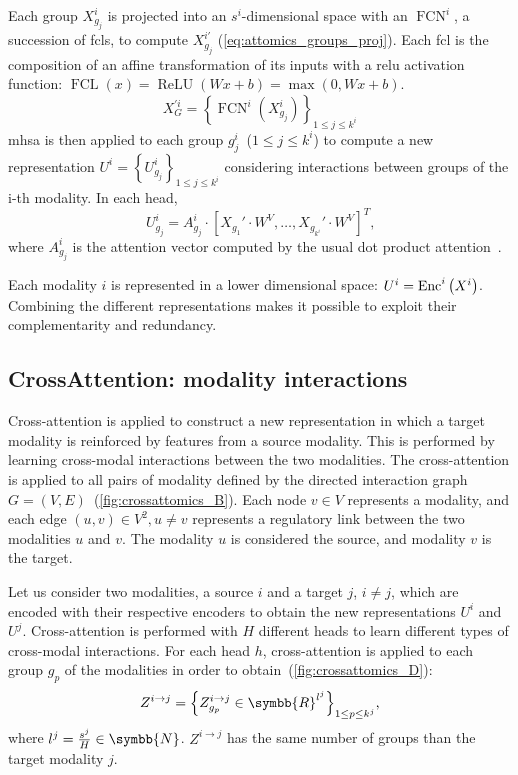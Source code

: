 \documentclass[../main.tex]{subfiles}
\begin{document}
		Each group  \(X^{i}_{g_j}\) is projected into an \(s^i\)-dimensional space with an \(\operatorname{FCN}^i\), a succession of \glspl{fcl}, to compute \(X^{i'}_{g_j}\) (\cref{eq:attomics_groups_proj}).
		Each \gls{fcl} is the composition of an affine transformation of its inputs with a \gls{relu} activation function: \(\operatorname{FCL}\left(x\right) = \operatorname{ReLU}\left(Wx+b \right) = \max\left(0, Wx+b\right)\).
		\begin{equation}
			X^{'i}_{G} = {\left\{\operatorname{FCN}^i\left(X^{i}_{g_j} \right) \right\}}_{1\leq j\leq k^i}\label{eq:attomics_groups_proj}
		\end{equation}
		\Gls{mhsa} is then applied to each group \(g^i_j\)~(\(1 \leq j \leq k^i \)) to compute a new representation \({U^i = {\left\{ U^i_{g_j}\right\}}_{1 \leq j \leq k^i}}\) considering interactions between groups of the i-th modality.
		In each head,
		\begin{equation}
			U^{i}_{g_j} = A^{i}_{g_j} \cdot {\left[ X_{g_1}' \cdot W^V, \ldots ,  X_{g_{k^i}}' \cdot W^V\right]}^T \text{,}\label{eq:enc_mhsa}
		\end{equation}
		where \(A^{i}_{g_j}\) is the attention vector computed by the usual dot product attention~\cite{AttentionAllYouNeed}.

		Each modality \(i\) is represented in a lower dimensional space: \(U^{i} = \operatorname{Enc}^{i}\left(X^{i}\right)\).
		Combining the different representations makes it possible to exploit their complementarity and redundancy.

	\subsection{CrossAttention: modality interactions}\label{sec:crossatt}
		Cross-attention is applied to construct a new representation in which a target modality is reinforced by features from a source modality.
		This is performed by learning cross-modal interactions between the two modalities.
		The cross-attention is applied to all pairs of modality defined by the directed interaction graph \({G = \left(V,E\right)}\)~(\cref{fig:crossattomics_B}).
		Each node \(v \in V\) represents a modality, and each edge \(\left(u,v\right) \in V^2, u\neq v\) represents a regulatory link between the two modalities \(u\) and \(v\).
		The modality \(u\) is considered the source, and modality \(v\) is the target.

		Let us consider two modalities, a source \(i\) and a target \(j\), \(i \neq j\), which are encoded with their respective encoders to obtain the new representations \(U^i\) and \(U^j\).
		Cross-attention is performed with \(H\) different heads to learn different types of cross-modal interactions.
		For each head \(h\), cross-attention is applied to each group \(g_p\) of the modalities in order to obtain~(\cref{fig:crossattomics_D}):
		\[ Z^{i\rightarrow j} = {\left\{ Z^{i\rightarrow j}_{g_p} \in \symbb{R}^{l^j} \right\}}_{1 \leq p \leq k^j}\text{,}\]
		where \(l^j = \frac{s^j}{H} \in \symbb{N}\).
		\( Z^{i\rightarrow j}\) has the same number of groups than the target modality \(j\).
\end{document}
